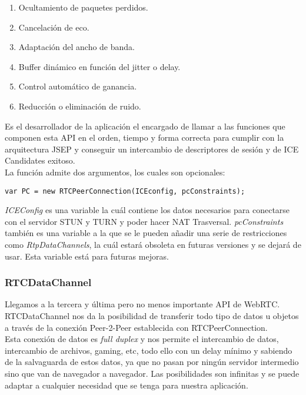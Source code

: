 \begin{enumerate}
\item Ocultamiento de paquetes perdidos.
\item Cancelación de eco.
\item Adaptación del ancho de banda.
\item Buffer dinámico en función del jitter o delay.
\item Control automático de ganancia.
\item Reducción o eliminación de ruido.
\end{enumerate}

Es el desarrollador de la aplicación el encargado de llamar a las funciones que componen esta API en el orden, tiempo y forma correcta para cumplir con la arquitectura JSEP y conseguir un intercambio de descriptores de sesión y de ICE Candidates exitoso.\\

\noindent La función admite dos argumentos, los cuales son opcionales: 

\begin{lstlisting}[caption=Llamada a función RTCPeerConnection]
var PC = new RTCPeerConnection(ICEconfig, pcConstraints);
\end{lstlisting}

\textit{ICEConfig} es una variable la cuál contiene los datos necesarios para conectarse con el servidor STUN y TURN y poder hacer NAT Trasversal. \textit{pcConstraints} también es una variable a la que se le pueden añadir una serie de restricciones como \textit{RtpDataChannels}, la cuál estará obsoleta en futuras versiones y se dejará de usar. Esta variable está para futuras mejoras.\\

\subsubsection{RTCDataChannel}

Llegamos a la tercera y última pero no menos importante API de WebRTC. RTCDataChannel nos da la posibilidad de transferir todo tipo de datos u objetos a través de la conexión Peer-2-Peer establecida con RTCPeerConnection.\\

Esta conexión de datos es \textit{full duplex} y nos permite el intercambio de datos, intercambio de archivos, gaming, etc, todo ello con un delay mínimo y sabiendo de la salvaguarda de estos datos, ya que no pasan por ningún servidor intermedio sino que van de navegador a navegador. Las posibilidades son infinitas y se puede adaptar a cualquier necesidad que se tenga para nuestra aplicación.\\


